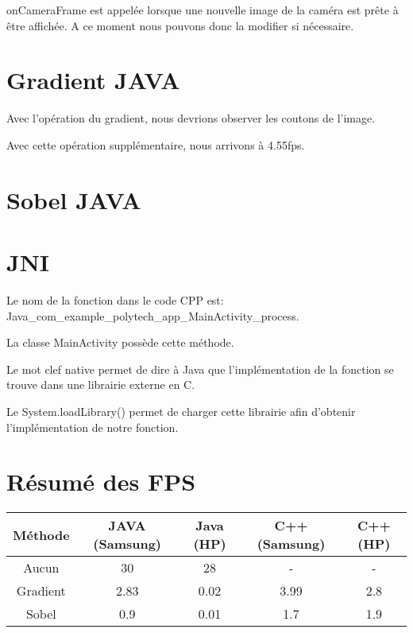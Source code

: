 \documentclass{report}
\begin{document}
				onCameraFrame est appelée lorsque une nouvelle image de la caméra est prête à être affichée.
				A ce moment nous pouvons donc la modifier si nécessaire.
		\section{Gradient JAVA}
			Avec l'opération du gradient, nous devrions observer les coutons de l'image.
			
			Avec cette opération supplémentaire, nous arrivons à 4.55fps.
			
		\section{Sobel JAVA}
		
		\section{JNI}
			Le nom de la fonction dans le code CPP est: Java\_com\_example\_polytech\_app\_MainActivity\_process.
			
			La classe MainActivity possède cette méthode.
			
			Le mot clef native permet de dire à Java que l'implémentation de la fonction se trouve dans une librairie externe en C.
			
			Le System.loadLibrary() permet de charger cette librairie afin d'obtenir l'implémentation de notre fonction.
			
		\section{Résumé des FPS}
			\begin{tabular}{|c|c|c|c|c|}
				\hline
				Méthode & JAVA (Samsung) & Java (HP) & C++ (Samsung) & C++ (HP)\\\hline
				Aucun & 30 & 28 & - & -\\\hline
				Gradient & 2.83 & 0.02 & 3.99 & 2.8\\\hline
				Sobel & 0.9 & 0.01 & 1.7 & 1.9\\\hline
			\end{tabular}
\end{document}
